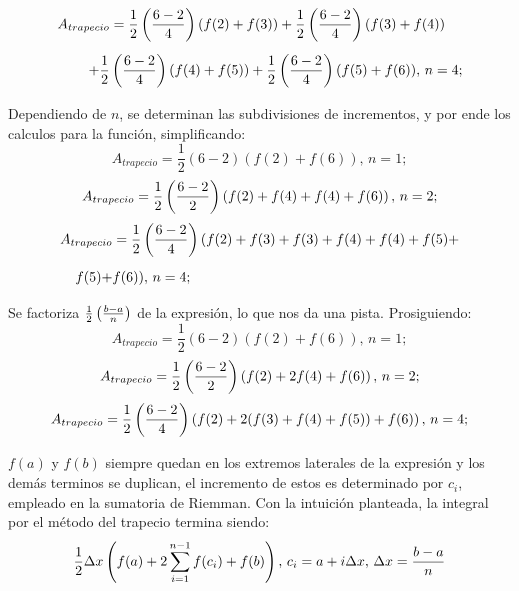 \documentclass[letterpaper, 12pt]{article}
\begin{document}
{\large \begin{equation*}
    \begin{aligned}
        A_{trapecio}&=\frac{1}{2}\left({6-2 \over 4}\right)(f(2)+f(3))+\frac{1}{2}\left({6-2 \over 4}\right)(f(3)+f(4))\\[5pt]
        +\frac{1}{2}&\left({6-2 \over 4}\right)(f(4)+f(5))+\frac{1}{2}\left({6-2 \over 4}\right)(f(5)+f(6)),\, n=4;\\[5pt]
    \end{aligned}
\end{equation*}}
\justify
Dependiendo de \(n\), se determinan las subdivisiones de incrementos, y por ende los calculos para la función, simplificando:
{\large \[A_{trapecio}=\frac{1}{2}(6-2)(f(2)+f(6)),\, n=1;\]}
{\large \[A_{trapecio}=\frac{1}{2}\left({6-2 \over 2}\right)\left(f(2)+f(4)+f(4)+f(6)\right),\, n=2;\]}
{\large \begin{equation*}
    \begin{aligned}
        A_{trapecio}&=\frac{1}{2}\left({6-2 \over 4}\right)(f(2)+f(3)+f(3)+f(4)+f(4)+f(5)+\\[5pt]
        f(5)+&f(6)),\, n=4;\\[5pt]
    \end{aligned}
\end{equation*}}
\justify
Se factoriza \(\frac{1}{2}\left({b-a\over n}\right)\) de la expresión, lo que nos da una pista. Prosiguiendo:
{\large \[A_{trapecio}=\frac{1}{2}(6-2)(f(2)+f(6)),\, n=1;\]}
{\large \[A_{trapecio}=\frac{1}{2}\left({6-2 \over 2}\right)\left(f(2)+2f(4)+f(6)\right),\, n=2;\]}
{\large \begin{equation*}
    \begin{aligned}
        A_{trapecio}&=\frac{1}{2}\left({6-2 \over 4}\right)\left(f(2)+2(f(3)+f(4)+f(5))+f(6)\right),\, n=4;\\[5pt]
    \end{aligned}
\end{equation*}}
\justify
\(f(a)\) y \(f(b)\) siempre quedan en los extremos laterales de la expresión y los demás terminos se duplican, el incremento de estos es determinado por \(c_i\), empleado en la sumatoria de Riemman.
Con la intuición planteada, la integral por el método del trapecio termina siendo:
{\large \[\frac{1}{2}\Delta x\left(f(a)+2\sum_{i=1}^{n-1}f(c_i)+f(b)\right),\, c_i=a+i\Delta x,\, \Delta x = {b-a\over n}\]}
\end{document}
